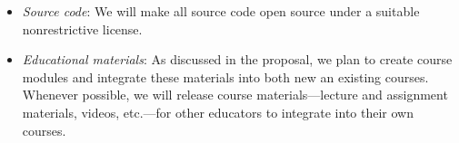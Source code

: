 \begin{itemize}
\item
  \emph{Source code}: We will make all source code open
  source under a suitable nonrestrictive license.
\item
  \emph{Educational materials}: As discussed in the proposal, we plan to
        create course modules and integrate these materials into both new an
        existing courses. Whenever possible, we will release course
        materials---lecture and assignment materials, videos, etc.---for other
        educators to integrate into their own courses.
\end{itemize}
